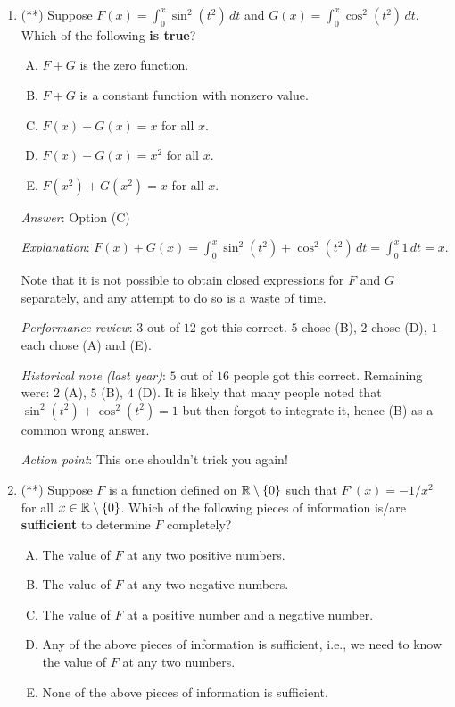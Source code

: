 \documentclass[10pt]{amsart}
\begin{document}
\begin{enumerate}
  {\em Performance review}: $3$ out of $12$ got this correct. $4$
  chose (E), $3$ chose (C), $2$ chose (D).

  {\em Historical note (last year)}: $3$ out of $16$ people got this
  correct. Remaining were: $2$ (B), $3$ (C), $1$ (D), $7$ (E).

  {\em Action point}: This is the kind of question that everybody
  should get correct in the future. Please make sure you understand
  the solution process for this question.

\item (**) Suppose $F(x) = \int_0^x \sin^2(t^2) \, dt$ and $G(x) =
  \int_0^x \cos^2(t^2) \, dt$. Which of the following {\bf is true}?

  \begin{enumerate}[(A)]
  \item $F + G$ is the zero function.
  \item $F + G$ is a constant function with nonzero value.
  \item $F(x) + G(x) = x$ for all $x$.
  \item $F(x) + G(x) = x^2$ for all $x$.
  \item $F(x^2) + G(x^2) = x$ for all $x$.
  \end{enumerate}

  {\em Answer}: Option (C)

  {\em Explanation}: $F(x) + G(x) = \int_0^x \sin^2(t^2) + \cos^2(t^2)
  \, dt = \int_0^x 1 \, dt = x$.

  Note that it is not possible to obtain closed expressions for $F$
  and $G$ separately, and any attempt to do so is a waste of time.

  {\em Performance review}: $3$ out of $12$ got this correct. $5$
  chose (B), $2$ chose (D), $1$ each chose (A) and (E).

  {\em Historical note (last year)}: $5$ out of $16$ people got this
  correct. Remaining were: $2$ (A), $5$ (B), $4$ (D). It is likely
  that many people noted that $\sin^2(t^2) + \cos^2(t^2) = 1$ but then
  forgot to integrate it, hence (B) as a common wrong answer.

  {\em Action point}: This one shouldn't trick you again!

\item (**) Suppose $F$ is a function defined on $\mathbb{R} \setminus \{ 0 \}$
  such that $F'(x) = -1/x^2$ for all $x \in \mathbb{R} \setminus \{ 0
  \}$. Which of the following pieces of information is/are {\bf
  sufficient} to determine $F$ completely?
  \begin{enumerate}[(A)]
  \item The value of $F$ at any two positive numbers.
  \item The value of $F$ at any two negative numbers.
  \item The value of $F$ at a positive number and a negative number.
  \item Any of the above pieces of information is sufficient, i.e., we
    need to know the value of $F$ at any two numbers.
  \item None of the above pieces of information is sufficient.
  \end{enumerate}


\end{enumerate}
\end{document}
